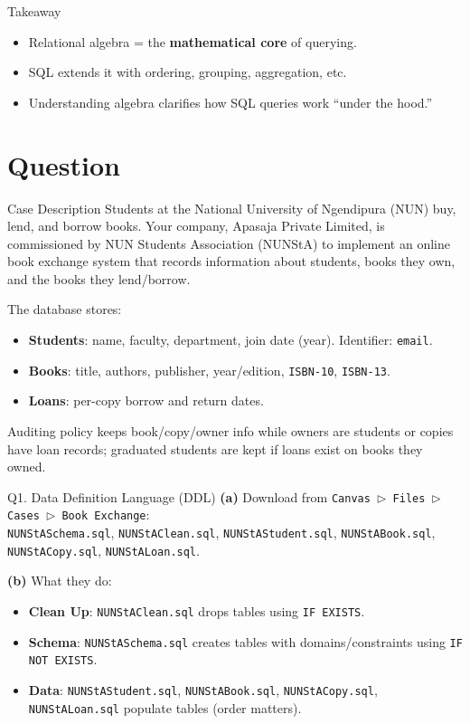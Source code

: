 \documentclass{beamer}
\begin{document}
\begin{frame}{Takeaway}
\begin{itemize}
  \item Relational algebra = the \textbf{mathematical core} of querying.
  \item SQL extends it with ordering, grouping, aggregation, etc.
  \item Understanding algebra clarifies how SQL queries work “under the hood.”
\end{itemize}
\end{frame}

\section{Question}

\begin{frame}{Case Description}
Students at the National University of Ngendipura (NUN) buy, lend, and borrow books.
Your company, Apasaja Private Limited, is commissioned by NUN Students Association (NUNStA) to implement an online book exchange system that records information about students, books they own, and the books they lend/borrow.

The database stores:
\begin{itemize}
  \item \textbf{Students}: name, faculty, department, join date (year). Identifier: \texttt{email}.
  \item \textbf{Books}: title, authors, publisher, year/edition, \texttt{ISBN-10}, \texttt{ISBN-13}.
  \item \textbf{Loans}: per-copy borrow and return dates.
\end{itemize}
Auditing policy keeps book/copy/owner info while owners are students or copies have loan records;
graduated students are kept if loans exist on books they owned.
\end{frame}

\begin{frame}{Q1. Data Definition Language (DDL)}
\textbf{(a)} Download from \texttt{Canvas $\triangleright$ Files $\triangleright$ Cases $\triangleright$ Book Exchange}:\\
\texttt{NUNStASchema.sql}, \texttt{NUNStAClean.sql}, \texttt{NUNStAStudent.sql}, \texttt{NUNStABook.sql}, \texttt{NUNStACopy.sql}, \texttt{NUNStALoan.sql}.
\vspace{0.5em}

\textbf{(b)} What they do:
\begin{itemize}
  \item \textbf{Clean Up}: \texttt{NUNStAClean.sql} drops tables using \texttt{IF EXISTS}.
  \item \textbf{Schema}: \texttt{NUNStASchema.sql} creates tables with domains/constraints using \texttt{IF NOT EXISTS}.
  \item \textbf{Data}: \texttt{NUNStAStudent.sql}, \texttt{NUNStABook.sql}, \texttt{NUNStACopy.sql}, \texttt{NUNStALoan.sql} populate tables (order matters).
\end{itemize}
\end{frame}
\end{document}
